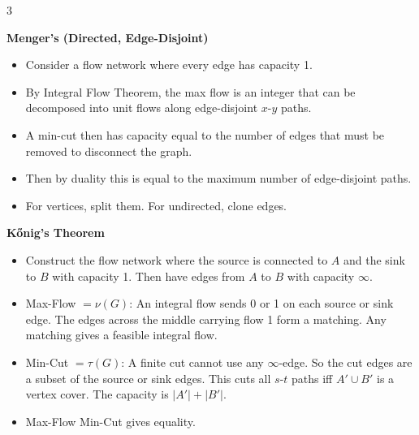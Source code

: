 \documentclass[10pt, landscape]{article}
\begin{document}
\begin{multicols*}{3}

\textbf{Menger's (Directed, Edge-Disjoint)}
\begin{itemize}
    \item Consider a flow network where every edge has capacity 1.
    \item By Integral Flow Theorem, the max flow is an integer that can be decomposed into unit flows along edge-disjoint $x$-$y$ paths.
    \item A min-cut then has capacity equal to the number of edges that must be removed to disconnect the graph.
    \item Then by duality this is equal to the maximum number of edge-disjoint paths.
    \item For vertices, split them. For undirected, clone edges.
\end{itemize}



\textbf{Kőnig's Theorem}
\begin{itemize}
    \item Construct the flow network where the source is connected to $A$ and the sink to $B$ with capacity 1. Then have edges from $A$ to $B$ with capacity $\infty$.
    \item Max-Flow $=\nu(G)$: An integral flow sends 0 or 1 on each source or sink edge. The edges across the middle carrying flow 1 form a matching. Any matching gives a feasible integral flow.
    \item Min-Cut $=\tau(G)$: A finite cut cannot use any $\infty$-edge. So the cut edges are a subset of the source or sink edges. This cuts all $s$-$t$ paths iff $A' \cup B'$ is a vertex cover. The capacity is $|A'|+|B'|$.
    \item Max-Flow Min-Cut gives equality.
\end{itemize}


\end{multicols*}
\end{document}
